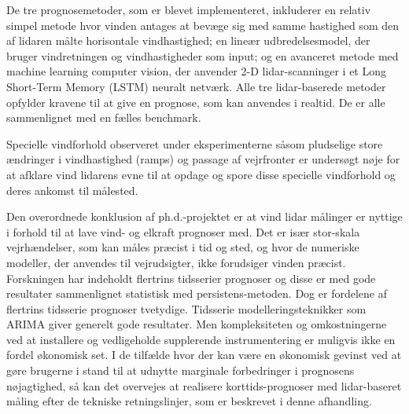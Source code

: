 De tre prognosemetoder, som er blevet implementeret, inkluderer en relativ simpel metode hvor vinden antages at bev{\ae}ge sig med samme hastighed som den af lidaren m{\aa}lte horisontale vindhastighed; en line{\ae}r udbredelsesmodel, der bruger vindretningen og vindhastigheder som input; og en avanceret metode med machine learning computer vision, der anvender 2-D lidar-scanninger i et Long Short-Term Memory (LSTM) neuralt netv{\ae}rk. Alle tre lidar-baserede metoder opfylder kravene til at give en prognose, som kan anvendes i realtid. De er alle sammenlignet med en f{\ae}lles benchmark.

Specielle vindforhold observeret under eksperimenterne s{\aa}som pludselige store {\ae}ndringer i vindhastighed (ramps) og passage af vejrfronter er unders{\o}gt n{\o}je for at afklare vind lidarens evne til at opdage og spore disse specielle vindforhold og deres ankomst til m{\aa}lested. 

Den overordnede konklusion af ph.d.-projektet er at vind lidar m{\aa}linger er nyttige i forhold til at lave vind- og elkraft prognoser med. Det er is{\ae}r stor-skala vejrh{\ae}ndelser, som kan m{\aa}les pr{\ae}cist i tid og sted, og hvor de numeriske modeller, der anvendes til vejrudsigter, ikke forudsiger vinden pr{\ae}cist. Forskningen har indeholdt flertrins tidsserier prognoser og disse er med gode resultater sammenlignet statistisk med persistens-metoden. Dog er fordelene af flertrins tidsserie prognoser tvetydige. Tidsserie modelleringsteknikker som ARIMA giver generelt gode resultater. Men kompleksiteten og omkostningerne ved at installere og vedligeholde supplerende instrumentering er muligvis ikke en fordel {\o}konomisk set. I de tilf{\ae}lde hvor der kan v{\ae}re en {\o}konomisk gevinst ved at g{\o}re brugerne i stand til at udnytte marginale forbedringer i prognosens n{\o}jagtighed, s{\aa} kan det overvejes at realisere korttids-prognoser med lidar-baseret m{\aa}ling efter de tekniske retningslinjer, som er beskrevet i denne afhandling.
